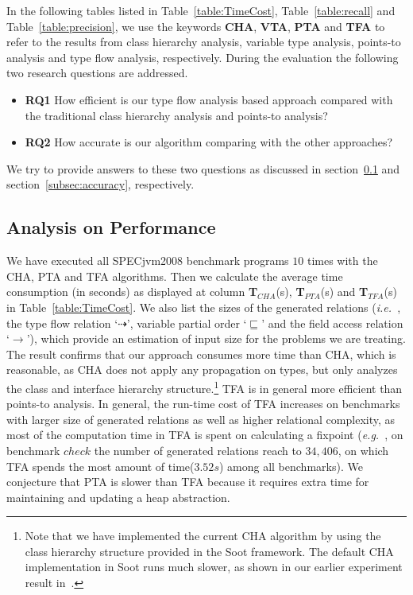 \documentclass{fac}
\newcommand\eg{\textit{e.g.\ }}
\newcommand\ie{\textit{i.e.\ }}
\newcommand{\less}{\sqsubseteq}
\newcommand{\tflow}{\dashrightarrow}
\newcommand{\hflow}{\longrightarrow}
\begin{document}
In the following tables listed in Table~\ref{table:TimeCost}, Table~\ref{table:recall} and Table~\ref{table:precision}, we use the keywords \textbf{CHA}, \textbf{VTA}, \textbf{PTA} and \textbf{TFA} to refer to the results from class hierarchy analysis, variable type analysis, points-to analysis and type flow analysis, respectively. During the evaluation the following two research questions are addressed. %
\begin{itemize}
\item \textbf{RQ1} How efficient is our type flow analysis based approach compared with the traditional class hierarchy analysis and points-to analysis?
\item \textbf{RQ2} How accurate is our algorithm comparing with the other approaches?
\end{itemize}
We try to provide answers to these two questions as discussed in section~\ref{subsec:efficiency} and section~\ref{subsec:accuracy}, respectively.

\subsection{Analysis on Performance}\label{subsec:efficiency}

We have executed all SPECjvm2008 benchmark programs $10$ times with the CHA, PTA and TFA algorithms. Then we calculate the average time consumption (in seconds) as displayed at column \textbf{T$_{CHA}$}(s), \textbf{T$_{PTA}$}(s) and \textbf{T$_{TFA}$}(s) in Table~\ref{table:TimeCost}. We also list the sizes of the generated relations (\ie, the type flow relation `$\tflow$', variable partial order `$\less$' and the field access relation `$\hflow$'), which provide an estimation of input size for the problems we are treating. The result confirms that our approach consumes more time than CHA, which is reasonable, as CHA does not apply any propagation on types, but only analyzes the class and interface hierarchy structure.\footnote{Note that we have implemented the current CHA algorithm by using the class hierarchy structure provided in the Soot framework. The default CHA implementation in Soot runs much slower, as shown in our earlier experiment result in~\cite{ZhuoZ19}.} TFA is in general more efficient than points-to analysis. In general, the run-time cost of TFA increases on benchmarks with larger size of generated relations as well as higher relational complexity, as most of the computation time in TFA is spent on calculating a fixpoint (\eg, on benchmark $check$ the number of generated relations reach to $34,406$, on which TFA spends the most amount of time($3.52s$) among all benchmarks). We conjecture that PTA is slower than TFA because it requires extra time for maintaining and updating a heap abstraction.
\end{document}
